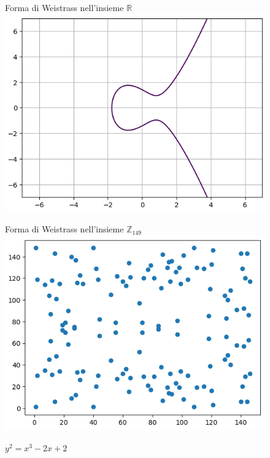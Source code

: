 \begin{flushleft}
    \begin{figure}[h]
        \centering
        \begin{minipage}[t]{0.45\textwidth}
            \centering
            Forma di Weistrass nell'insieme $\mathbb{R}$ \\
            \includegraphics[width=\textwidth]{img/ec_wform.png}
            \caption{$y^2 = x^3 - 2x + 2$}
        \end{minipage}
        \hfill
        \begin{minipage}[t]{0.45\textwidth}
            \centering
            Forma di Weistrass nell'insieme $\mathbb{Z}_{149}$ \\
            \includegraphics[width=\textwidth]{img/ec_modform.png}
            \caption{$y^2 = x^3 - 2x +2$}
        \end{minipage}
    \end{figure}


\end{flushleft}
